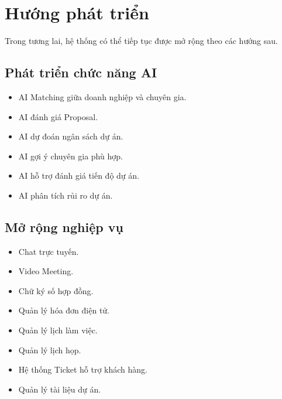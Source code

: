 \section{Hướng phát triển}

Trong tương lai, hệ thống có thể tiếp tục được mở rộng theo các hướng sau.

\subsection{Phát triển chức năng AI}

\begin{itemize}

\item AI Matching giữa doanh nghiệp và chuyên gia.

\item AI đánh giá Proposal.

\item AI dự đoán ngân sách dự án.

\item AI gợi ý chuyên gia phù hợp.

\item AI hỗ trợ đánh giá tiến độ dự án.

\item AI phân tích rủi ro dự án.

\end{itemize}


\subsection{Mở rộng nghiệp vụ}

\begin{itemize}

\item Chat trực tuyến.

\item Video Meeting.

\item Chữ ký số hợp đồng.

\item Quản lý hóa đơn điện tử.

\item Quản lý lịch làm việc.

\item Quản lý lịch họp.

\item Hệ thống Ticket hỗ trợ khách hàng.

\item Quản lý tài liệu dự án.

\end{itemize}

